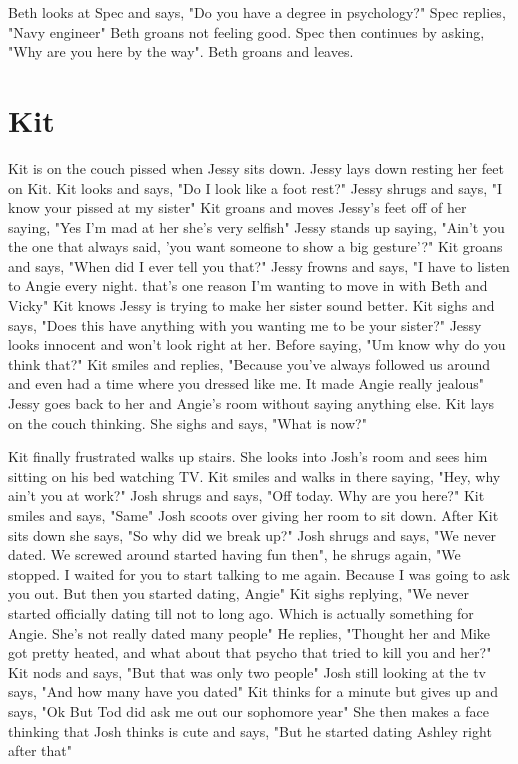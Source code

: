 \documentclass{article}[12px] %
\begin{document}
Beth looks at Spec and says, "Do you have a degree in psychology?" Spec replies, "Navy engineer" Beth groans not feeling good. Spec then continues by asking, "Why are you here by the way". Beth groans and leaves.\\

\section {Kit}
Kit is on the couch pissed when Jessy sits down. Jessy lays down resting her feet on Kit. Kit looks and says, "Do I look like a foot rest?" Jessy shrugs and says, "I know your pissed at my sister" Kit groans and moves Jessy's feet off of her saying, "Yes I'm mad at her she's very selfish" Jessy stands up saying, "Ain't you the one that always said, 'you want someone to show a big gesture'?" Kit groans and says, "When did I ever tell you that?" Jessy frowns and says, "I have to listen to Angie every night. that's one reason I'm wanting to move in with Beth and Vicky" Kit knows Jessy is trying to make her sister sound better. Kit sighs and says, "Does this have anything with you wanting me to be your sister?" Jessy looks innocent and won't look right at her. Before saying, "Um know why do you think that?" Kit smiles and replies, "Because you've always followed us around and even had a time where you dressed like me. It made Angie really jealous"\\

Jessy goes back to her and Angie's room without saying anything else. Kit lays on the couch thinking. She sighs and says, "What is now?"

Kit finally frustrated walks up stairs. She looks into Josh's room and sees him sitting on his bed watching TV. Kit smiles and walks in there saying, "Hey, why ain't you at work?" Josh shrugs and says, "Off today. Why are you here?" Kit smiles and says, "Same" Josh scoots over giving her room to sit down. After Kit sits down she says, "So why did we break up?" Josh shrugs and says, "We never dated. We screwed around started having fun then", he shrugs again, "We stopped. I waited for you to start talking to me again. Because I was going to ask you out. But then you started dating, Angie" Kit sighs replying, "We never started officially dating till not to long ago. Which is actually something for Angie. She's not really dated many people" He replies, "Thought her and Mike got pretty heated, and what about that psycho that tried to kill you and her?" Kit nods and says, "But that was only two people" Josh still looking at the tv says, "And how many have you dated" Kit thinks for a minute but gives up and says, "Ok But Tod did ask me out our sophomore year" She then makes a face thinking that Josh thinks is cute and says, "But he started dating Ashley right after that"
\end{document}
